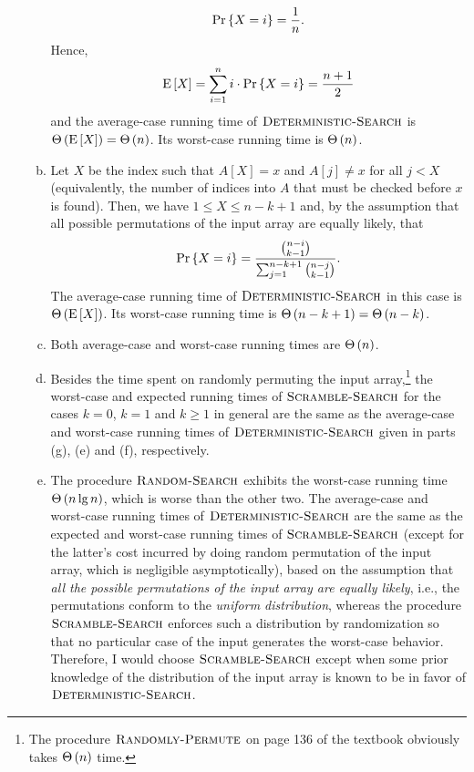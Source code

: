 \begin{enumerate}[\thechapter-1]
\begin{enumerate}[(a)]
\[
\Pr\left\{X = i\right\} = \frac{1}{n}.
\]
Hence,
\[
\mathrm{E}\left[X\right] = \sum^n_{i = 1} i \cdot \Pr\left\{X = i\right\} = \frac{n + 1}{2}
\]
and the average-case running time of $\textnormal{\scshape Deterministic-Search}$ is $\Theta\left(\mathrm{E}\left[X\right]\right) = \Theta\left(n\right)$. Its worst-case running time is $\Theta\left(n\right)$.
\item Let $X$ be the index such that $A[X] = x$ and $A[j] \neq x$ for all $j < X$ (equivalently, the number of indices into $A$ that must be checked before $x$ is found). Then, we have $1 \leq X \leq n - k + 1$ and, by the assumption that all possible permutations of the input array are equally likely, that
\[
\Pr\left\{X = i\right\} = \frac{{n - i \choose k - 1}}{\sum^{n - k + 1}_{j = 1} {n - j \choose k - 1}}.
\]
The average-case running time of $\textnormal{\scshape Deterministic-Search}$ in this case is $\Theta\left(\mathrm{E}\left[X\right]\right)$. Its worst-case running time is $\Theta\left(n - k + 1\right) = \Theta\left(n - k\right)$.
\item Both average-case and worst-case running times are $\Theta\left(n\right)$.
\item Besides the time spent on randomly permuting the input array,\footnote{The procedure $\textnormal{\scshape Randomly-Permute}$ on page 136 of the textbook obviously takes $\Theta\left(n\right)$ time.} the worst-case and expected running times of $\textnormal{\scshape Scramble-Search}$ for the cases $k = 0$, $k = 1$ and $k \geq 1$ in general are the same as the average-case and worst-case running times of $\textnormal{\scshape Deterministic-Search}$ given in parts (g), (e) and (f), respectively.
\item The procedure $\textnormal{\scshape Random-Search}$ exhibits the worst-case running time $\Theta\left(n \lg n\right)$, which is worse than the other two. The average-case and worst-case running times of $\textnormal{\scshape Deterministic-Search}$ are the same as the expected and worst-case running times of $\textnormal{\scshape Scramble-Search}$ (except for the latter's cost incurred by doing random permutation of the input array, which is negligible asymptotically), based on the assumption that \emph{all the possible permutations of the input array are equally likely}, i.e., the permutations conform to the \emph{uniform distribution}, whereas the procedure $\textnormal{\scshape Scramble-Search}$ enforces such a distribution by randomization so that no particular case of the input generates the worst-case behavior. Therefore, I would choose $\textnormal{\scshape Scramble-Search}$ except when some prior knowledge of the distribution of the input array is known to be in favor of $\textnormal{\scshape Deterministic-Search}$.
\end{enumerate}
%
\end{enumerate}